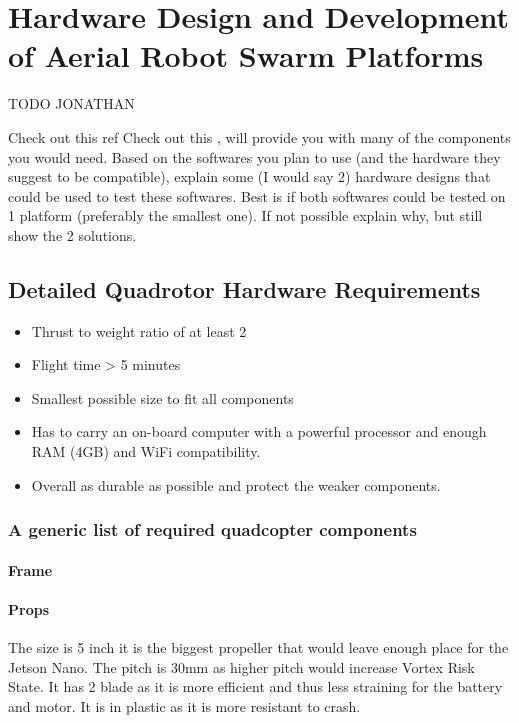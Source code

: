 \chapter{Hardware Design and Development of Aerial Robot Swarm Platforms}
    {\color{red}TODO JONATHAN}
    
    Check out this ref
    {\color{red} Check out this \cite{dojofordrones_rpi_drone}, will provide you with many of the components you would need.}
    Based on the softwares you plan to use (and the hardware they suggest to be compatible), explain some (I would say 2) hardware designs that could be used to test these softwares. Best is if both softwares could be tested on 1 platform (preferably the smallest one). If not possible explain why, but still show the 2 solutions.
    
    \section{Detailed Quadrotor Hardware Requirements}
        \begin{itemize}
            \item Thrust to weight ratio of at least 2
            \item Flight time > 5 minutes
            \item Smallest possible size to fit all components
            \item Has to carry an on-board computer with a powerful processor and enough RAM (4GB) and WiFi compatibility.
            \item Overall as durable as possible and protect the weaker components.
        \end{itemize}
        
        \subsection{A generic list of required quadcopter components}
        
            \subsubsection{Frame}
            
            \subsubsection{Props}
                The size is 5 inch it is the biggest propeller that would leave enough place for the Jetson Nano. The pitch is 30mm as higher pitch would increase Vortex Risk State. It has 2 blade as it is more efficient and thus less straining for the battery and motor. It is in plastic as it is more resistant to crash.
                
